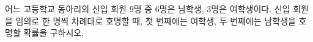 어느 고등학교 동아리의 신입 회원 $9$명 중 $6$명은 남학생, $3$명은 여학생이다. 신입 회원을 임의로 한 명씩 차례대로 호명할 때, 첫 번째에는 여학생, 두 번째에는 남학생을 호명할 확률을 구하시오.
